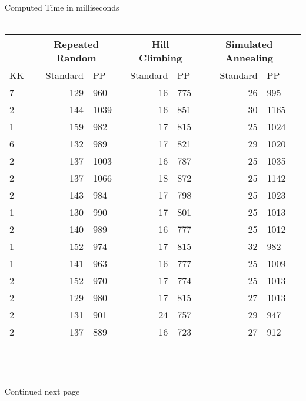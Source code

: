 \documentclass[11pt]{article}
\begin{document}
\\
Computed Time in milliseconds \\
\\
\begin{tabular}{l r l r l r l}
 & \multicolumn{2}{c}{Repeated Random} & \multicolumn{2}{c}{Hill Climbing} & \multicolumn{2}{c}{Simulated Annealing} \\ \hline
KK & Standard & PP & Standard & PP & Standard & PP \\ \hline
7 & 129 & 960 & 16 & 775 & 26 & 995 \\ \hline
2 & 144 & 1039 & 16 & 851 & 30 & 1165 \\ 
1 & 159 & 982 & 17 & 815 & 25 & 1024 \\ 
6 & 132 & 989 & 17 & 821 & 29 & 1020 \\ 
2 & 137 & 1003 & 16 & 787 & 25 & 1035 \\ 
2 & 137 & 1066 & 18 & 872 & 25 & 1142 \\ 
2 & 143 & 984 & 17 & 798 & 25 & 1023 \\ 
1 & 130 & 990 & 17 & 801 & 25 & 1013 \\ 
2 & 140 & 989 & 16 & 777 & 25 & 1012 \\ 
1 & 152 & 974 & 17 & 815 & 32 & 982 \\ 
1 & 141 & 963 & 16 & 777 & 25 & 1009 \\ 
2 & 152 & 970 & 17 & 774 & 25 & 1013 \\ 
2 & 129 & 980 & 17 & 815 & 27 & 1013 \\ 
2 & 131 & 901 & 24 & 757 & 29 & 947 \\ 
2 & 137 & 889 & 16 & 723 & 27 & 912 \\ 
\end{tabular}
\\
\\
\\
Continued next page
\newpage
\end{document}

